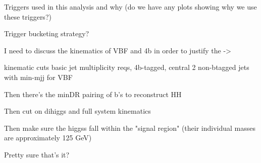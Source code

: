     Triggers used in this analysis and why (do we have any plots showing why we use these triggers?)

    Trigger bucketing strategy?

    I need to discuss the kinematics of VBF and 4b in order to justify the ->

    kinematic cuts
        basic jet multiplicity reqs,
        4b-tagged, central
        2 non-btagged jets with min-mjj for VBF

    Then there's the minDR pairing of b's to reconstruct HH

    Then cut on dihiggs and full system kinematics

    Then make sure the higgss fall within the "signal region" (their individual masses are approximately 125 GeV)

    Pretty sure that's it?



%
